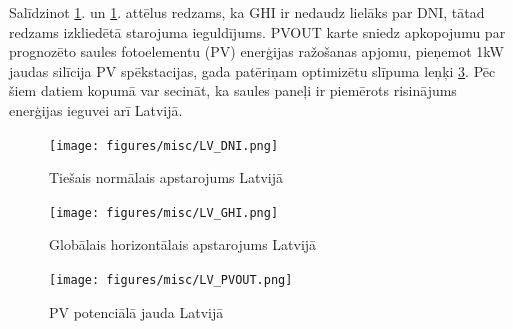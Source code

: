 Salīdzinot \ref{fig:lv_DNI}. un  \ref{fig:lv_DNI}. attēlus redzams, ka GHI ir nedaudz lielāks par DNI, tātad redzams izkliedētā starojuma ieguldījums. PVOUT karte sniedz apkopojumu par prognozēto saules fotoelementu (PV) enerģijas ražošanas apjomu, pieņemot 1kW jaudas silīcija PV spēkstacijas, gada patēriņam optimizētu slīpuma leņķi \ref{fig:lv_PVOUT}. Pēc šiem datiem kopumā var secināt, ka saules paneļi ir piemērots risinājums enerģijas ieguvei arī Latvijā.


\begin{figure}[h]
    \centering
    \texttt{[image: figures/misc/LV\_DNI.png]}
    \caption{Tiešais normālais apstarojums Latvijā \cite{solargis}}
    \label{fig:lv_DNI}
\end{figure}
\begin{figure}[h]
    \centering
    \texttt{[image: figures/misc/LV\_GHI.png]}
    \caption{Globālais horizontālais apstarojums Latvijā \cite{solargis}}
    \label{fig:lv_GHI}
\end{figure}
\begin{figure}[h]
    \centering
    \texttt{[image: figures/misc/LV\_PVOUT.png]}
    \caption{PV potenciālā jauda Latvijā \cite{solargis}}
    \label{fig:lv_PVOUT}
\end{figure}